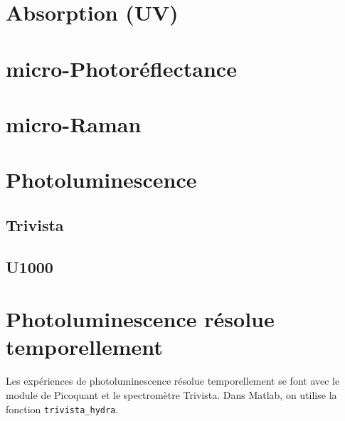 \documentclass[11pt,francais]{book} %
\begin{document}
\section{Absorption (UV)}

\section{micro-Photoréflectance}

\section{micro-Raman}

\section{Photoluminescence}

\subsection{Trivista}

\subsection{U1000}

\section{Photoluminescence résolue temporellement}
\label{Photoluminescence résolue temporellement}

Les expériences de photoluminescence résolue temporellement se font avec le module de Picoquant et le spectromètre Trivista.
Dans Matlab, on utilise la fonction \lstinline{trivista_hydra}.
\end{document}
